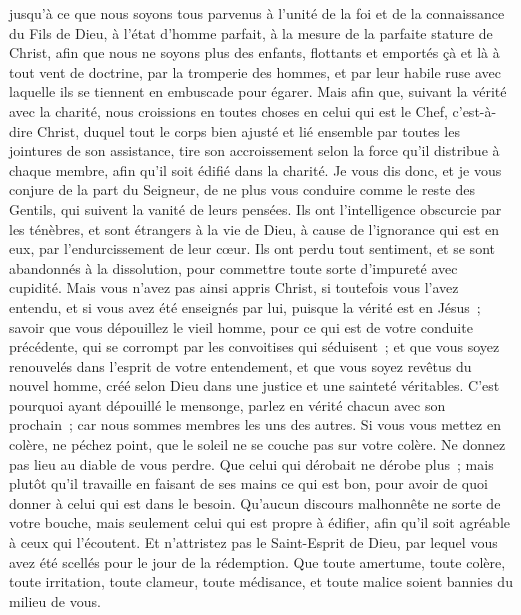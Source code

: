 \begin{multicols}{2}
jusqu'à ce que nous soyons tous parvenus à l'unité de la foi et de la connaissance du Fils de Dieu, à l'état d'homme parfait, à la mesure de la parfaite stature de Christ,
afin que nous ne soyons plus des enfants, flottants et emportés çà et là à tout vent de doctrine, par la tromperie des hommes, et par leur habile ruse avec laquelle ils se tiennent en embuscade pour égarer.
Mais afin que, suivant la vérité avec la charité, nous croissions en toutes choses en celui qui est le Chef, c'est-à-dire Christ,
duquel tout le corps bien ajusté et lié ensemble par toutes les jointures de son assistance, tire son accroissement selon la force qu'il distribue à chaque membre, afin qu'il soit édifié dans la charité.
Je vous dis donc, et je vous conjure de la part du Seigneur, de ne plus vous conduire comme le reste des Gentils, qui suivent la vanité de leurs pensées.
Ils ont l'intelligence obscurcie par les ténèbres, et sont étrangers à la vie de Dieu, à cause de l'ignorance qui est en eux, par l'endurcissement de leur cœur.
Ils ont perdu tout sentiment, et se sont abandonnés à la dissolution, pour commettre toute sorte d'impureté avec cupidité.
Mais vous n'avez pas ainsi appris Christ,
si toutefois vous l'avez entendu, et si vous avez été enseignés par lui, puisque la vérité est en Jésus~; 
savoir que vous dépouillez le vieil homme, pour ce qui est de votre conduite précédente, qui se corrompt par les convoitises qui séduisent~; 
et que vous soyez renouvelés dans l'esprit de votre entendement,
et que vous soyez revêtus du nouvel homme, créé selon Dieu dans une justice et une sainteté véritables.
C'est pourquoi ayant dépouillé le mensonge, parlez en vérité chacun avec son prochain~; car nous sommes membres les uns des autres.
Si vous vous mettez en colère, ne péchez point, que le soleil ne se couche pas sur votre colère.
Ne donnez pas lieu au diable de vous perdre.
Que celui qui dérobait ne dérobe plus~; mais plutôt qu'il travaille en faisant de ses mains ce qui est bon, pour avoir de quoi donner à celui qui est dans le besoin.
Qu'aucun discours malhonnête ne sorte de votre bouche, mais seulement celui qui est propre à édifier, afin qu'il soit agréable à ceux qui l'écoutent.
Et n'attristez pas le Saint-Esprit de Dieu, par lequel vous avez été scellés pour le jour de la rédemption.
Que toute amertume, toute colère, toute irritation, toute clameur, toute médisance, et toute malice soient bannies du milieu de vous.

\end{multicols}
